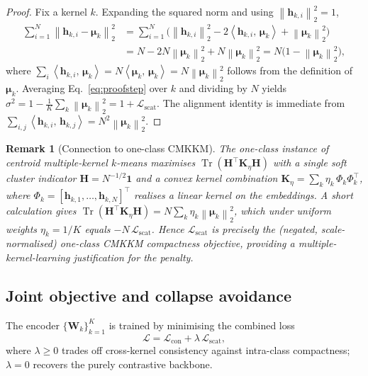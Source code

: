 \documentclass[preprint,12pt]{elsarticle}
\newtheorem{remark}{Remark}
\newcommand{\norm}[1]{\left\lVert #1 \right\rVert}
\newcommand{\inner}[2]{\left\langle #1,\, #2 \right\rangle}
\newcommand{\Lcross}{\mathcal{L}_{\mathrm{con}}}
\newcommand{\Lscat}{\mathcal{L}_{\mathrm{scat}}}
\newcommand{\Ltot}{\mathcal{L}}
\newcommand{\hh}{\bm{h}}
\newcommand{\WW}{\bm{W}}
\newcommand{\mmu}{\bm{\mu}}
\begin{document}
\begin{proof}
Fix a kernel $k$. Expanding the squared norm and using $\norm{\hh_{k,i}}_2^2=1$,
\begin{align}
\sum_{i=1}^{N}\norm{\hh_{k,i}-\mmu_k}_2^{2}
&=\sum_{i=1}^{N}\!\Big(\norm{\hh_{k,i}}_2^{2}
-2\inner{\hh_{k,i}}{\mmu_k}+\norm{\mmu_k}_2^{2}\Big)\nonumber\\
&=N-2N\norm{\mmu_k}_2^{2}+N\norm{\mmu_k}_2^{2}
=N\big(1-\norm{\mmu_k}_2^{2}\big),
\label{eq:proofstep}
\end{align}
where $\sum_i\inner{\hh_{k,i}}{\mmu_k}=N\inner{\mmu_k}{\mmu_k}=N\norm{\mmu_k}_2^2$
follows from the definition of $\mmu_k$. Averaging Eq.~\eqref{eq:proofstep} over
$k$ and dividing by $N$ yields
$\sigma^2=1-\frac{1}{K}\sum_k\norm{\mmu_k}_2^2=1+\Lscat$. The
alignment identity is immediate from
$\sum_{i,j}\inner{\hh_{k,i}}{\hh_{k,j}}=N^2\norm{\mmu_k}_2^2$.
\end{proof}

\begin{remark}[Connection to one-class CMKKM]
The one-class instance of centroid multiple-kernel $k$-means maximises
$\operatorname{Tr}(\bm{H}^{\!\top}\bm{K}_{\eta}\bm{H})$ with a single soft cluster
indicator $\bm{H}=N^{-1/2}\bm{1}$ and a convex kernel combination
$\bm{K}_{\eta}=\sum_k\eta_k\,\Phi_k\Phi_k^{\!\top}$, where
$\Phi_k=[\hh_{k,1},\dots,\hh_{k,N}]^{\!\top}$ realises a linear kernel on the
embeddings. A short calculation gives
$\operatorname{Tr}(\bm{H}^{\!\top}\bm{K}_{\eta}\bm{H})
=N\sum_k\eta_k\norm{\mmu_k}_2^2$, which under uniform weights
$\eta_k=1/K$ equals $-N\,\Lscat$. Hence $\Lscat$ is precisely the
(negated, scale-normalised) one-class CMKKM compactness objective, providing a
multiple-kernel-learning justification for the penalty.
\end{remark}

\subsection{Joint objective and collapse avoidance}
\label{subsec:joint}

The encoder $\{\WW_k\}_{k=1}^{K}$ is trained by minimising the combined loss
\begin{equation}
\Ltot=\Lcross+\lambda\,\Lscat,
\label{eq:total}
\end{equation}
where $\lambda\ge 0$ trades off cross-kernel consistency against intra-class
compactness; $\lambda=0$ recovers the purely contrastive backbone.
\end{document}
